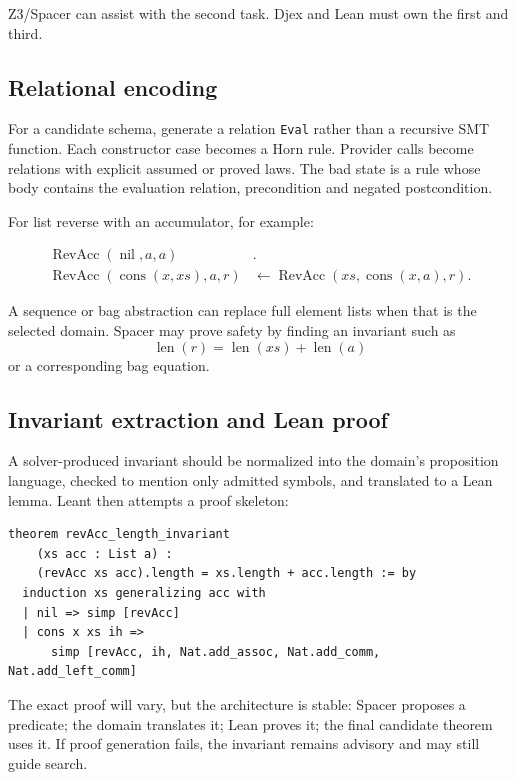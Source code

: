 \documentclass[11pt,oneside]{report}
\newcommand{\code}[1]{\texttt{#1}}
\begin{document}
Z3/Spacer can assist with the second task. Djex and Lean must own the first and third.

\subsection{Relational encoding}

For a candidate schema, generate a relation \code{Eval} rather than a recursive SMT function. Each constructor case becomes a Horn rule. Provider calls become relations with explicit assumed or proved laws. The bad state is a rule whose body contains the evaluation relation, precondition and negated postcondition.

For list reverse with an accumulator, for example:

\begin{align*}
\operatorname{RevAcc}(\operatorname{nil},a,a) &.\\
\operatorname{RevAcc}(\operatorname{cons}(x,xs),a,r) &\leftarrow
  \operatorname{RevAcc}(xs,\operatorname{cons}(x,a),r).
\end{align*}

A sequence or bag abstraction can replace full element lists when that is the selected domain. Spacer may prove safety by finding an invariant such as
\[
  \operatorname{len}(r)=\operatorname{len}(xs)+\operatorname{len}(a)
\]
or a corresponding bag equation.

\subsection{Invariant extraction and Lean proof}

A solver-produced invariant should be normalized into the domain's proposition language, checked to mention only admitted symbols, and translated to a Lean lemma. Leant then attempts a proof skeleton:

\begin{lstlisting}[language=LeanX,caption={Illustrative generated invariant proof skeleton.}]
theorem revAcc_length_invariant
    (xs acc : List a) :
    (revAcc xs acc).length = xs.length + acc.length := by
  induction xs generalizing acc with
  | nil => simp [revAcc]
  | cons x xs ih =>
      simp [revAcc, ih, Nat.add_assoc, Nat.add_comm, Nat.add_left_comm]
\end{lstlisting}

The exact proof will vary, but the architecture is stable: Spacer proposes a predicate; the domain translates it; Lean proves it; the final candidate theorem uses it. If proof generation fails, the invariant remains advisory and may still guide search.
\end{document}
